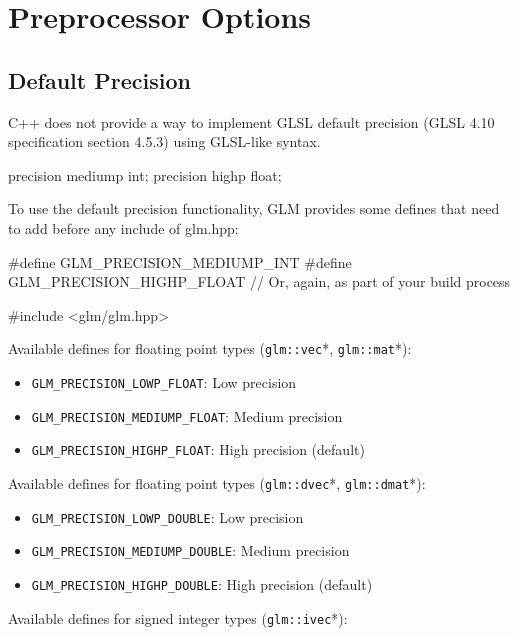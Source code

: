 \documentclass{scrartcl}
\numberwithin{figure}{subsection}
\begin{document}
\newpage{}

\section{Preprocessor Options}

\subsection{Default Precision}
C++ does not provide a way to implement GLSL default precision (GLSL 4.10 specification section 4.5.3) using GLSL-like syntax.

\begin{glslcode}
precision mediump int;
precision highp float;
\end{glslcode}

To use the default precision functionality, GLM provides some defines that need to add before any include of glm.hpp:

\begin{cppcode}
#define GLM_PRECISION_MEDIUMP_INT
#define GLM_PRECISION_HIGHP_FLOAT
// Or, again, as part of your build process

#include <glm/glm.hpp>
\end{cppcode}

Available defines for floating point types (\verb|glm::vec|*, \verb|glm::mat|*):

\begin{itemize}
    \item \verb|GLM_PRECISION_LOWP_FLOAT|: Low precision
    \item \verb|GLM_PRECISION_MEDIUMP_FLOAT|: Medium precision 
    \item \verb|GLM_PRECISION_HIGHP_FLOAT|: High precision (default)
\end{itemize}

Available defines for floating point types (\verb|glm::dvec|*, \verb|glm::dmat|*):

\begin{itemize}
    \item \verb|GLM_PRECISION_LOWP_DOUBLE|: Low precision
    \item \verb|GLM_PRECISION_MEDIUMP_DOUBLE|: Medium precision 
    \item \verb|GLM_PRECISION_HIGHP_DOUBLE|: High precision (default)
\end{itemize}

Available defines for signed integer types (\verb|glm::ivec|*):
\end{document}
